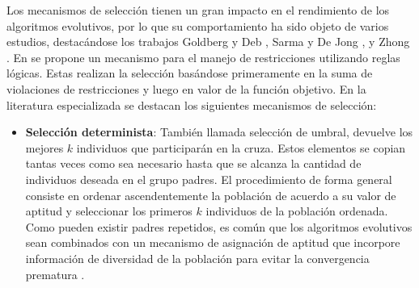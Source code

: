 Los mecanismos de selección tienen un gran impacto en el rendimiento de los algoritmos evolutivos, por lo que su comportamiento ha sido objeto de varios estudios, destacándose los trabajos Goldberg y Deb \cite{Goldberg91acomparative}, Sarma y De Jong \cite{sarma1997analysis} , y Zhong \cite{Zhong_comparisonof}. En \cite{deb_efficient_1998} se propone un mecanismo para el manejo de restricciones utilizando reglas lógicas. Estas realizan la selección basándose primeramente en la suma de violaciones de restricciones y luego en valor de la función objetivo. En la literatura especializada se destacan los siguientes mecanismos de selección:
\begin{itemize}
\item\textbf{Selección determinista}: También llamada selección de umbral, devuelve los mejores $k$ individuos que participarán en la cruza. Estos elementos se copian tantas veces como sea necesario hasta que se alcanza la cantidad de individuos deseada  en el grupo padres. El procedimiento de forma general consiste en ordenar ascendentemente la población de acuerdo a su valor de aptitud y seleccionar los primeros $k$ individuos de la población ordenada. Como pueden existir padres repetidos, es común que los algoritmos evolutivos sean combinados con un mecanismo de asignación de aptitud que incorpore información de diversidad de la población para evitar la convergencia prematura \cite{laessig_threshold_2008}.


\end{itemize}
